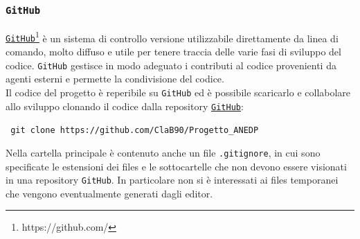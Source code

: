 \subsubsection{\texttt{GitHub}}
\href{https://github.com/}{\texttt{GitHub}}\footnote{https://github.com/} è un sistema di controllo versione utilizzabile direttamente da linea di comando, molto diffuso e utile per tenere traccia delle varie fasi di sviluppo del codice. \texttt{GitHub} gestisce in modo adeguato i contributi al codice provenienti da agenti esterni e permette la condivisione del codice.\\
Il codice del progetto è reperibile su \texttt{GitHub} ed è possibile scaricarlo e collabolare allo sviluppo clonando il codice dalla repository  \href{https://github.com/}{\texttt{GitHub}}:\\
\begin{center}
\texttt{ git clone https://github.com/ClaB90/Progetto\_ANEDP}
\end{center}
Nella cartella principale è contenuto anche un file \texttt{.gitignore}, in cui sono specificate le estensioni dei files e le sottocartelle che non devono essere visionati in una repository \texttt{GitHub}. In particolare non si è interessati ai files temporanei che vengono eventualmente generati dagli editor.

